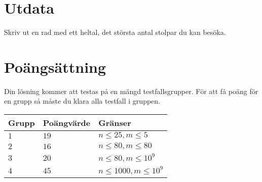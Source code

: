 \section*{Utdata}
Skriv ut en rad med ett heltal, det största antal stolpar du kan besöka.

\section*{Poängsättning}
Din lösning kommer att testas på en mängd testfallsgrupper.
För att få poäng för en grupp så måste du klara alla testfall i gruppen.

\noindent
\begin{tabular}{| l | l | l |}
\hline
Grupp & Poängvärde & Gränser \\ \hline
$1$   & $19$       & $n \leq 25, m \leq 5$ \\ \hline
$2$   & $16$      & $n \leq 80, m \leq 80$ \\ \hline
$3$   & $20$      & $n \leq 80, m \leq 10^9$ \\ \hline
$4$   & $45$      & $n \le 1000, m \leq 10^9$ \\ \hline
\end{tabular}
